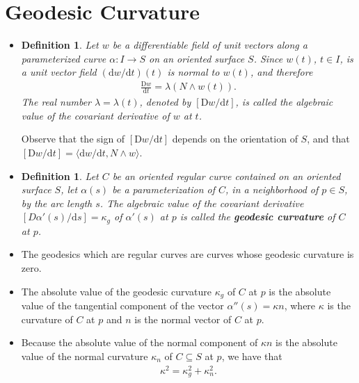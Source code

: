 \documentclass[10pt]{article}
\newtheorem{definition}[lemma]{Definition}
\newcommand{\dee}{\mathrm{d}}
\newcommand{\Dee}{\mathrm{D}}
\newcommand{\ra}{\rightarrow}
\newcommand{\sseq}{\subseteq}
\begin{document}
  \section{Geodesic Curvature}

  \begin{itemize}
    \item \begin{definition}
      Let $w$ be a differentiable field of unit vectors along a parameterized curve $\alpha: I \ra S$ on an oriented surface $S$. Since $w(t)$, $t \in I$, is a unit vector field $(\dee w / \dee t)(t)$ is normal to $w(t)$, and therefore
      \begin{align*}
        \frac{\Dee w}{\dee t} = \lambda(N \wedge w(t)).
      \end{align*}
      The real number $\lambda = \lambda(t)$, denoted by $[\Dee w / \dee t]$, is called the algebraic value of the covariant derivative of $w$ at $t$.
    \end{definition}

    Observe that the sign of $[\Dee w/ \dee t]$ depends on the orientation of $S$, and that $[\Dee w / \dee t] = \langle \dee w / \dee t, N \wedge w \rangle$.

    \item \begin{definition}
      Let $C$ be an oriented regular curve contained on an oriented surface $S$, let $\alpha(s)$ be a parameterization of $C$, in a neighborhood of $p \in S$, by the arc length $s$. The algebraic value of the covariant derivative $[D\alpha'(s) / \dee s] = \kappa_g$ of $\alpha'(s)$ at $p$ is called the {\bf geodesic curvature} of $C$ at $p$.
    \end{definition}

    \item The geodesics which are regular curves are curves whose geodesic curvature is zero.

    \item The absolute value of the geodesic curvature $\kappa_g$ of $C$ at $p$ is the absolute value of the tangential component of the vector $\alpha''(s) = \kappa n$, where $\kappa$ is the curvature of $C$ at $p$ and $n$ is the normal vector of $C$ at $p$.

    \item Because the absolute value of the normal component of $\kappa n$ is the absolute value of the normal curvature $\kappa_n$ of $C \sseq S$ at $p$, we have that
    \begin{align*}
      \kappa^2 = \kappa^2_g + \kappa^2_n.
    \end{align*}


\end{itemize}
\end{document}
